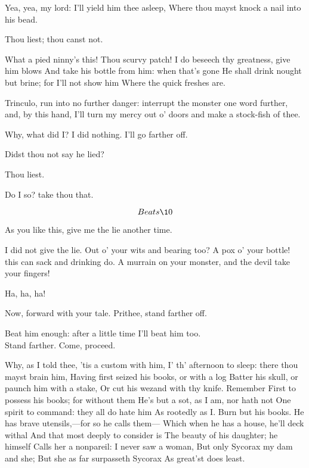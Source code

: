 \documentclass[11pt]{book}
\begin{document}
\5	Yea, yea, my lord: I'll yield him thee asleep,
	Where thou mayst knock a nail into his bead.

\4	Thou liest; thou canst not.

\5	What a pied ninny's this! Thou scurvy patch!
	I do beseech thy greatness, give him blows
	And take his bottle from him: when that's gone
	He shall drink nought but brine; for I'll not show him
	Where the quick freshes are.

\begin{PROSE}

	Trinculo, run into no further danger:
	interrupt the monster one word further, and,
	by this hand, I'll turn my mercy out o' doors
	and make a stock-fish of thee.

	Why, what did I? I did nothing. I'll go farther off.

	Didst thou not say he lied?

\4	Thou liest.

	Do I so? take thou that.

	\[Beats \10\]

	As you like this, give me the lie another time.

	I did not give the lie. Out o' your
	wits and bearing too? A pox o' your bottle!
	this can sack and drinking do. A murrain on
	your monster, and the devil take your fingers!

\5	Ha, ha, ha!

	Now, forward with your tale. Prithee, stand farther
	off.

\end{PROSE}

\5	Beat him enough: after a little time
	I'll beat him too. \\

	                  Stand farther. Come, proceed.

\5	Why, as I told thee, 'tis a custom with him,
	I' th' afternoon to sleep: there thou mayst brain him,
	Having first seized his books, or with a log
	Batter his skull, or paunch him with a stake,
	Or cut his wezand with thy knife. Remember
	First to possess his books; for without them
	He's but a sot, as I am, nor hath not
	One spirit to command: they all do hate him
	As rootedly as I. Burn but his books.
	He has brave utensils,---for so he calls them---
	Which when he has a house, he'll deck withal
	And that most deeply to consider is
	The beauty of his daughter; he himself
	Calls her a nonpareil: I never saw a woman,
	But only Sycorax my dam and she;
	But she as far surpasseth Sycorax
	As great'st does least. \\
\end{document}
